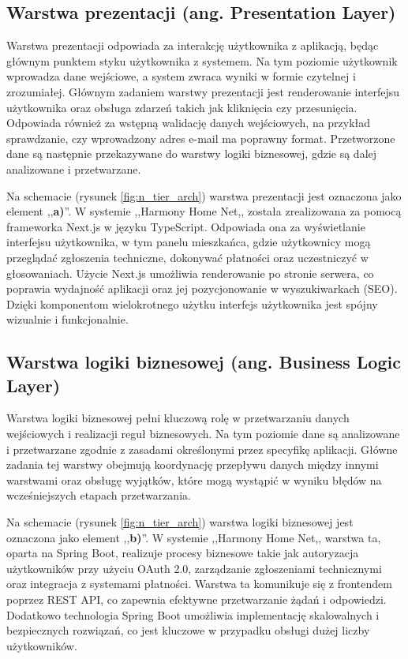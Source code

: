 \subsection{Warstwa prezentacji (ang. Presentation Layer)}
Warstwa prezentacji odpowiada za interakcję użytkownika z aplikacją, będąc głównym punktem styku użytkownika z systemem. Na tym poziomie użytkownik wprowadza dane wejściowe, a system zwraca wyniki w formie czytelnej i zrozumiałej. Głównym zadaniem warstwy prezentacji jest renderowanie interfejsu użytkownika oraz obsługa zdarzeń takich jak kliknięcia czy przesunięcia. Odpowiada również za wstępną walidację danych wejściowych, na przykład sprawdzanie, czy wprowadzony adres e-mail ma poprawny format. Przetworzone dane są następnie przekazywane do warstwy logiki biznesowej, gdzie są dalej analizowane i przetwarzane.

Na schemacie (rysunek \ref{fig:n_tier_arch}) warstwa prezentacji jest oznaczona jako element ,,\textbf{a)}''. W systemie ,,Harmony Home Net,, została zrealizowana za pomocą frameworka Next.js w języku TypeScript. Odpowiada ona za wyświetlanie interfejsu użytkownika, w tym panelu mieszkańca, gdzie użytkownicy mogą przeglądać zgłoszenia techniczne, dokonywać płatności oraz uczestniczyć w głosowaniach. Użycie Next.js umożliwia renderowanie po stronie serwera, co poprawia wydajność aplikacji oraz jej pozycjonowanie w wyszukiwarkach (SEO). Dzięki komponentom wielokrotnego użytku interfejs użytkownika jest spójny wizualnie i funkcjonalnie. 

\subsection{Warstwa logiki biznesowej (ang. Business Logic Layer)}

Warstwa logiki biznesowej pełni kluczową rolę w przetwarzaniu danych wejściowych i realizacji reguł biznesowych. Na tym poziomie dane są analizowane i przetwarzane zgodnie z zasadami określonymi przez specyfikę aplikacji. Główne zadania tej warstwy obejmują koordynację przepływu danych między innymi warstwami oraz obsługę wyjątków, które mogą wystąpić w wyniku błędów na wcześniejszych etapach przetwarzania.

Na schemacie (rysunek \ref{fig:n_tier_arch}) warstwa logiki biznesowej jest oznaczona jako element ,,\textbf{b)}''. W systemie ,,Harmony Home Net,, warstwa ta, oparta na Spring Boot, realizuje procesy biznesowe takie jak autoryzacja użytkowników przy użyciu OAuth 2.0, zarządzanie zgłoszeniami technicznymi oraz integracja z systemami płatności. Warstwa ta komunikuje się z frontendem poprzez REST API, co zapewnia efektywne przetwarzanie żądań i odpowiedzi. Dodatkowo technologia Spring Boot umożliwia implementację skalowalnych i bezpiecznych rozwiązań, co jest kluczowe w przypadku obsługi dużej liczby użytkowników.

